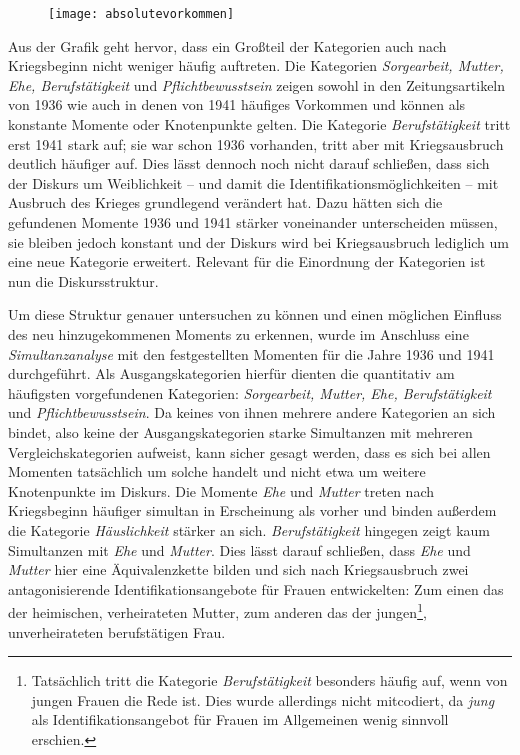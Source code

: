 \documentclass[12pt, titlepage=true, toc=bib]{scrartcl}
\begin{document}
{\begin{figure}[htbp] %
\centering
\texttt{[image: absolutevorkommen]}%
\end{figure}
 
\noindent Aus der Grafik geht hervor, dass ein Großteil der Kategorien auch nach Kriegsbeginn nicht weniger häufig auftreten. Die Kategorien \textit{Sorgearbeit, Mutter, Ehe, Berufstätigkeit} und \textit{Pflichtbewusstsein} zeigen sowohl in den Zeitungsartikeln von 1936 wie auch in denen von 1941 häufiges Vorkommen und können als konstante Momente oder Knotenpunkte gelten. Die Kategorie \textit{Berufstätigkeit} tritt erst 1941 stark auf; sie war schon 1936 vorhanden, tritt aber mit Kriegsausbruch deutlich häufiger auf. Dies lässt dennoch noch nicht darauf schließen, dass sich der Diskurs um Weiblichkeit -- und damit die Identifikationsmöglichkeiten -- mit Ausbruch des Krieges grundlegend verändert hat. Dazu hätten sich die gefundenen Momente 1936 und 1941 stärker voneinander unterscheiden müssen, sie bleiben jedoch konstant und der Diskurs wird bei Kriegsausbruch lediglich um eine neue Kategorie erweitert. Relevant für die Einordnung der Kategorien ist nun die Diskursstruktur.

Um diese Struktur genauer untersuchen zu können und einen möglichen Einfluss des neu hinzugekommenen Moments zu erkennen, wurde im Anschluss eine \textit{Simultanzanalyse} mit den festgestellten Momenten für die Jahre 1936 und 1941 durchgeführt. Als Ausgangskategorien hierfür dienten die quantitativ am häufigsten vorgefundenen Kategorien: \textit{Sorgearbeit, Mutter, Ehe, Berufstätigkeit} und \textit{Pflichtbewusstsein}. Da keines von ihnen mehrere andere Kategorien an sich bindet, also keine der Ausgangskategorien starke Simultanzen mit mehreren Vergleichskategorien aufweist, kann sicher gesagt werden, dass es sich bei allen Momenten tatsächlich um solche handelt und nicht etwa um weitere Knotenpunkte im Diskurs. Die Momente \textit{Ehe} und \textit{Mutter} treten nach Kriegsbeginn häufiger simultan in Erscheinung als vorher und binden außerdem die Kategorie \textit{Häuslichkeit} stärker an sich. \textit{Berufstätigkeit} hingegen zeigt kaum Simultanzen mit \textit{Ehe} und \textit{Mutter}. Dies lässt darauf schließen, dass \textit{Ehe} und \textit{Mutter} hier eine Äquivalenzkette bilden und sich nach Kriegsausbruch zwei antagonisierende Identifikationsangebote für Frauen entwickelten: Zum einen das der heimischen, verheirateten Mutter, zum anderen das der jungen\footnote{Tatsächlich tritt die Kategorie \textit{Berufstätigkeit} besonders häufig auf, wenn von jungen Frauen die Rede ist. Dies wurde allerdings nicht mitcodiert, da \textit{jung} als Identifikationsangebot für Frauen im Allgemeinen wenig sinnvoll erschien.}, unverheirateten berufstätigen Frau. 

}
\end{document}
